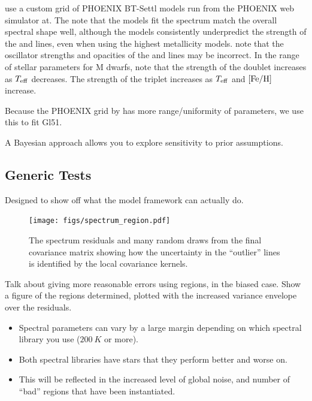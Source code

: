 \documentclass[iop,floatfix]{emulateapj}
\newcommand{\Z}{[{\rm Fe}/{\rm H}]}
\begin{document}
\citet{rojas-ayala12} use a custom grid of PHOENIX BT-Settl models run from the PHOENIX web simulator at. The note that the models fit the spectrum match the overall spectral shape well, although the models consistently underpredict the strength of the  and  lines, even when using the highest metallicity models. \citet{rajpurohit10} note that the oscillator strengths and opacities of the  and  lines may be incorrect. In the range of stellar parameters for M dwarfs, \citet{rojas-ayala12} note that the strength of the  doublet increases as $T_{\rm eff}$ decreases. The strength of the  triplet increases as $T_{\rm eff}$ and $\Z$ increase.

Because the PHOENIX grid by \citet{husser13} has more range/uniformity of parameters, we use this to fit Gl51.

A Bayesian approach allows you to explore sensitivity to prior assumptions.

\subsection{Generic Tests}

Designed to show off what the model framework can actually do. 

\begin{figure}[!htb]
\begin{center}
  \texttt{[image: figs/spectrum\_region.pdf]}
  \caption{The spectrum residuals and many random draws from the final covariance matrix showing how the uncertainty in the ``outlier'' lines is identified by the local covariance kernels.}
\label{fig:regions}
\end{center}
\end{figure}

Talk about giving more reasonable errors using regions, in the biased case.
Show a figure of the regions determined, plotted with the increased variance envelope over the residuals.

\begin{itemize}
  \item Spectral parameters can vary by a large margin depending on which spectral library you use ($200~K$ or more).
  \item Both spectral libraries have stars that they perform better and worse on.
  \item This will be reflected in the increased level of global noise, and number of ``bad'' regions that have been instantiated.
\end{itemize}
\end{document}
